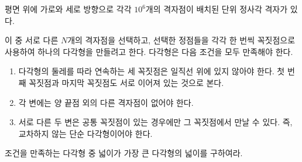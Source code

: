 
평면 위에 가로와 세로 방향으로 각각 $10^6$개의 격자점이 배치된 단위 정사각 격자가 있다.

이 중 서로 다른 $N$개의 격자점을 선택하고, 
선택한 정점들을 각각 한 번씩 꼭짓점으로 사용하여 하나의 다각형을 만들려고 한다.
다각형은 다음 조건을 모두 만족해야 한다.

\begin{enumerate}
    \item 다각형의 둘레를 따라 연속하는 세 꼭짓점은 일직선 위에 있지 않아야 한다.
    첫 번째 꼭짓점과 마지막 꼭짓점도 서로 이어져 있는 것으로 본다.
    \item 각 변에는 양 끝점 외의 다른 격자점이 없어야 한다.
    \item 서로 다른 두 변은 공통 꼭짓점이 있는 경우에만 그 꼭짓점에서 만날 수 있다. 즉, 교차하지 않는 단순 다각형이어야 한다.
\end{enumerate}

조건을 만족하는 다각형 중 넓이가 가장 큰 다각형의 넓이를 구하여라.